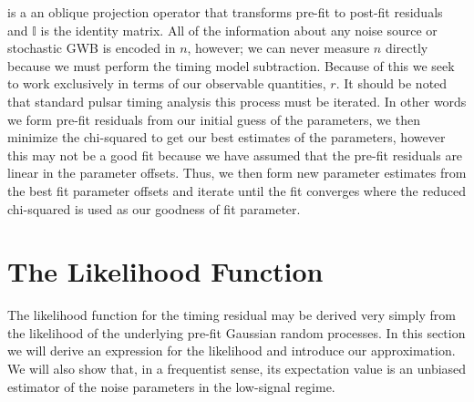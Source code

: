 \documentclass[iop]{emulateapj}
\begin{document}
is a an oblique projection operator that transforms pre-fit to post-fit residuals and $\mathbb{I}$ is the identity matrix. All of the information about any noise source or stochastic GWB is encoded in $n$, however; we can never measure $n$ directly because we must perform the timing model subtraction. Because of this we seek to work exclusively in terms of our observable quantities, $r$. It should be noted that standard pulsar timing analysis this process must be iterated. In other words we form pre-fit residuals from our initial guess of the parameters, we then minimize the chi-squared to get our best estimates of the parameters, however this may not be a good fit because we have assumed that the pre-fit residuals are linear in the parameter offsets. Thus, we then form new parameter estimates from the best fit parameter offsets and iterate until the fit converges where the reduced chi-squared is used as our goodness of fit parameter.


\section{The Likelihood Function}
\label{sec:likelihood}

The likelihood function for the timing residual may be derived very simply from the likelihood of the underlying pre-fit Gaussian random processes. 
In this section we will derive an expression for the likelihood and introduce our approximation. We will also show that, in a frequentist sense, its expectation value is an unbiased estimator of the noise parameters in the low-signal regime.
\end{document}

